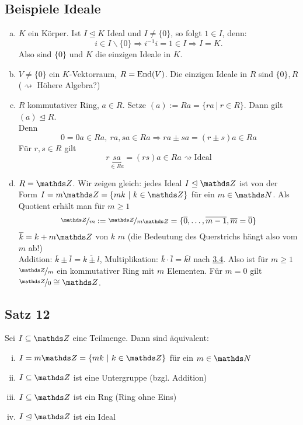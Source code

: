 \subsection{Beispiele Ideale}
\label{sub:bsp_ideale}
\begin{enumerate}[(a)]
	\item $K$ ein Körper. Ist $I\trianglelefteq K$ Ideal und $I\neq \{0\}$, so folgt $1\in I$, denn:
	\[
	i\in I\backslash\{0\}\Rightarrow i^{-1}i=1\in I \Rightarrow I=K.
	\]
	Also sind $\{0\}$ und $K$ die einzigen Ideale in $K$.
	\item $V\neq \{0\}$ ein $K$-Vektorraum, $R=\operatorname{End}(V)$. 
	Die einzigen Ideale in $R$ sind $\{0\},R$ ($\rightsquigarrow$ Höhere Algebra?)
	\item $R$ kommutativer Ring, $a\in R$. 
	Setze $(a):=Ra=\{ra~|~r\in R\}$. 
	Dann gilt $(a)\trianglelefteq R$. \\%
	Denn 
	\[
	0=0a\in Ra,~ra,sa\in Ra\Rightarrow ra\pm sa=(r\pm s)a\in Ra
	\]
	Für $r,s\in R$ gilt
	\[
	r\underbracket{sa}_{\in Ra}=(rs)a\in Ra \rightsquigarrow \text{Ideal}
	\]
	\item $R=\Z$. Wir zeigen gleich: jedes Ideal $I\trianglelefteq \Z$ ist von der Form $I=m\Z=\{mk~|~k\in \Z\}$ für ein $m\in \N$. Als Quotient erhält man für $m\ge 1$
	\[
	\nicefrac{\Z}{m}:=\nicefrac{\Z}{m\Z}=\{\overline{0},\dots,\overline{m-1},\overline{m}=\overline{0} \}
	\]
	$\overline{k}=k+m\Z$  von $k$  $m$ (die Bedeutung des Querstrichs hängt also vom $m$ ab!)\\
	Addition: $\overline{k}\pm\overline{l}=\overline{k\pm l}$, Multiplikation: $\overline{k}\cdot\overline{l}=\overline{kl}$ nach \hyperref[sub:homomor_ideale]{3.4}. 
	Also ist für $m\ge 1$ $\nicefrac{\Z}{m}$ ein kommutativer Ring mit $m$ Elementen.
	Für $m=0$ gilt $\nicefrac{\Z}{0}\cong \Z$.
\end{enumerate}


\subsection{Satz 12}
\label{sub:satz_12}
Sei $I\subseteq \Z$ eine Teilmenge. Dann sind äquivalent:
\begin{enumerate}[(i)]
	\item $I=m\Z=\{mk~|~k\in\Z\}$ für ein $m\in \N$
	\item $I\subseteq \Z$ ist eine Untergruppe (bzgl. Addition)
	\item $I\subseteq \Z$ ist ein Rng (Ring ohne Eins)
	\item $I\trianglelefteq \Z$ ist ein Ideal
\end{enumerate}

